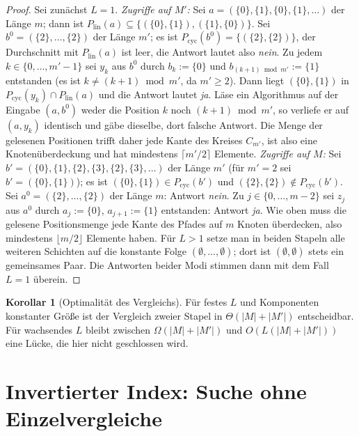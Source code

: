 \documentclass[a4paper,12pt, twoside]{report}
\theoremstyle{definition}
\newtheorem{korollar}{Korollar}
\begin{document}
\begin{proof}
	Sei zunächst $L=1$.
	\emph{Zugriffe auf $M'$:} Sei $a=(\{0\},\{1\},\{0\},\{1\},\dots)$ der Länge $m$; dann ist $P_{\mathrm{lin}}(a)\subseteq\{(\{0\},\{1\}),(\{1\},\{0\})\}$. Sei $b^0=(\{2\},\dots,\{2\})$ der Länge $m'$; es ist $P_{\mathrm{cyc}}(b^0)=\{(\{2\},\{2\})\}$, der Durchschnitt mit $P_{\mathrm{lin}}(a)$ ist leer, die Antwort lautet also \emph{nein}. Zu jedem $k\in\{0,\dots,m'-1\}$ sei $y_k$ aus $b^0$ durch $b_k:=\{0\}$ und $b_{(k+1)\bmod m'}:=\{1\}$ entstanden (es ist $k\ne(k+1)\bmod m'$, da $m'\ge2$). Dann liegt $(\{0\},\{1\})$ in $P_{\mathrm{cyc}}(y_k)\cap P_{\mathrm{lin}}(a)$ und die Antwort lautet \emph{ja}. Läse ein Algorithmus auf der Eingabe $(a,b^0)$ weder die Position $k$ noch $(k+1)\bmod m'$, so verliefe er auf $(a,y_k)$ identisch und gäbe dieselbe, dort falsche Antwort. Die Menge der gelesenen Positionen trifft daher jede Kante des Kreises $C_{m'}$, ist also eine Knotenüberdeckung und hat mindestens $\lceil m'/2\rceil$ Elemente.
	\emph{Zugriffe auf $M$:} Sei $b'=(\{0\},\{1\},\{2\},\{3\},\{2\},\{3\},\dots)$ der Länge $m'$ (für $m'=2$ sei $b'=(\{0\},\{1\})$); es ist $(\{0\},\{1\})\in P_{\mathrm{cyc}}(b')$ und $(\{2\},\{2\})\notin P_{\mathrm{cyc}}(b')$. Sei $a^0=(\{2\},\dots,\{2\})$ der Länge $m$: Antwort \emph{nein}. Zu $j\in\{0,\dots,m-2\}$ sei $z_j$ aus $a^0$ durch $a_j:=\{0\}$, $a_{j+1}:=\{1\}$ entstanden: Antwort \emph{ja}. Wie oben muss die gelesene Positionsmenge jede Kante des Pfades auf $m$ Knoten überdecken, also mindestens $\lfloor m/2\rfloor$ Elemente haben.
	Für $L>1$ setze man in beiden Stapeln alle weiteren Schichten auf die konstante Folge $(\emptyset,\dots,\emptyset)$; dort ist $(\emptyset,\emptyset)$ stets ein gemeinsames Paar. Die Antworten beider Modi stimmen dann mit dem Fall $L=1$ überein.
\end{proof}

\begin{korollar}[Optimalität des Vergleichs]
	Für festes $L$ und Komponenten konstanter Größe ist der Vergleich zweier Stapel in $\Theta(|M|+|M'|)$ entscheidbar. Für wachsendes $L$ bleibt zwischen $\Omega(|M|+|M'|)$ und $O(L(|M|+|M'|))$ eine Lücke, die hier nicht geschlossen wird.
\end{korollar}

\section{Invertierter Index: Suche ohne Einzelvergleiche}
\label{sec:univ_index}
\end{document}
